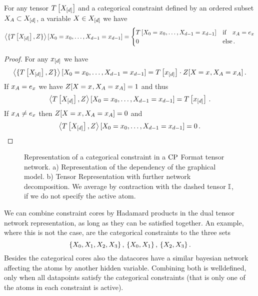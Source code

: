 \begin{theorem}
	For any tensor $T\left[X_{[d]}\right]$ and a categorical constraint defined by an ordered subset $X_{A}\subset X_{[d]}$, a variable $X\in X_{[d]}$ we have
	\begin{align*}
	 	\left\langle \{T\left[X_{[d]}\right], Z\}\right\rangle \left[ X_{0}=x_{0},\ldots,X_{d-1}=x_{d-1} \right] 
		= \begin{cases}
			T\left[X_{0}=x_{0},\ldots,X_{d-1}=x_{d-1}\right] & \text{if} \quad x_{A} = e_{x} \\
			0 & \text{else} \, . 
		\end{cases}
	\end{align*}
\end{theorem}
\begin{proof}
	For any $x_{[d]}$ we have
		\[ \left\langle \{T\left[X_{[d]}\right], Z\}\right\rangle \left[ X_{0}=x_{0},\ldots,X_{d-1}=x_{d-1} \right]  = 
			T\left[x_{[d]}\right] \cdot Z[X_{}=x_{},X_{A}=x_{A}] \, . 
		\]
	If $x_{A} = e_{x}$ we have $Z[X_{}=x_{},X_{A}=x_{A}] = 1$ and thus
		\[ \left\langle T\left[X_{[d]}\right],Z\right\rangle \left[ X_{0}=x_{0},\ldots,X_{d-1}=x_{d-1} \right]  =  T\left[x_{[d]}\right]  \, . \]
	If $x_{A} \neq e_{x}$ then $Z[X_{}=x_{},X_{A}=x_{A}] = 0$ and  
		\[ \left\langle T\left[X_{[d]}\right],Z\right\rangle \left[ X_{0}=x_{0},\ldots,X_{d-1}=x_{d-1} \right]  = 0 \, . \]
\end{proof}

\begin{figure}[h]
\begin{center}
	
\end{center}
\caption{Representation of a categorical constraint in a $\mathrm{CP}$ Format tensor network.
	a) Representation of the dependency of the graphical model.
	b) Tensor Representation with further network decomposition.
	We average by contraction with the dashed tensor $\mathbb{I}$, if we do not specify the active atom.
	}
\label{fig:CategoricalDecomposition}
\end{figure}

\begin{remark}
	We can combine constraint cores by Hadamard products in the dual tensor network representation, as long as they can be satisfied together.
	An example, where this is not the case, are the categorical constraints to the three sets
		\[ \{X_{0},X_{1},X_{2},X_{3}\} \, , \, \{X_{0},X_{1}\}\, ,\,\{X_{2},X_{3}\} \, . \] 
	Besides the categorical cores also the datacores have a similar bayesian network affecting the atoms by another hidden variable.
	Combining both is welldefined, only when all datapoints satisfy the categorical constraints (that is only one of the atoms in each constraint is active).
\end{remark}


